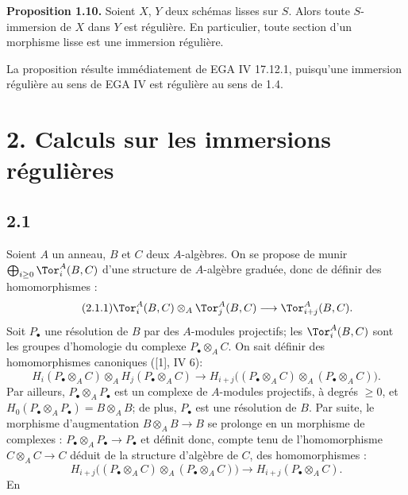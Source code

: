 \textbf{Proposition 1.10.} Soient \(X\), \(Y\) deux schémas lisses sur \(S\). Alors toute \(S\)-immersion de \(X\) dans \(Y\) est régulière. En particulier, toute section d'un morphisme lisse est une immersion régulière.

La proposition résulte immédiatement de EGA IV 17.12.1, puisqu'une immersion régulière au sens de EGA IV est régulière au sens de 1.4.

\section*{2. Calculs sur les immersions régulières}

\subsection*{2.1}
Soient \(A\) un anneau, \(B\) et \(C\) deux \(A\)-algèbres. On se propose de munir \(\bigoplus_{i\ge0}\Tor_i^A(B,C)\) d'une structure de \(A\)-algèbre graduée, donc de définir des homomorphismes :
\begin{equation}\tag{2.1.1}
 \Tor_i^A(B,C)\otimes_A\Tor_j^A(B,C)\longrightarrow \Tor_{i+j}^A(B,C).
\end{equation}
Soit \(P_\bullet\) une résolution de \(B\) par des \(A\)-modules projectifs; les \(\Tor_i^A(B,C)\) sont les groupes d'homologie du complexe \(P_\bullet\otimes_A C\). On sait définir des homomorphismes canoniques ([1], IV 6):
\begin{equation}\tag{2.1.2}
 H_i(P_\bullet\otimes_A C)\otimes_A H_j(P_\bullet\otimes_A C)
 \longrightarrow H_{i+j}\bigl((P_\bullet\otimes_A C)\otimes_A(P_\bullet\otimes_A C)\bigr).
\end{equation}
Par ailleurs, \(P_\bullet\otimes_A P_\bullet\) est un complexe de \(A\)-modules projectifs, à degrés \(\geq0\), et \(H_0(P_\bullet\otimes_A P_\bullet)=B\otimes_A B\); de plus, \(P_\bullet\) est une résolution de \(B\). Par suite, le morphisme d'augmentation \(B\otimes_A B\to B\) se prolonge en un morphisme de complexes : \(P_\bullet\otimes_A P_\bullet\to P_\bullet\) et définit donc, compte tenu de l'homomorphisme \(C\otimes_A C\to C\) déduit de la structure d'algèbre de \(C\), des homomorphismes :
\begin{equation}\tag{2.1.3}
 H_{i+j}\bigl((P_\bullet\otimes_A C)\otimes_A(P_\bullet\otimes_A C)\bigr)
 \longrightarrow H_{i+j}(P_\bullet\otimes_A C).
\end{equation}
En
